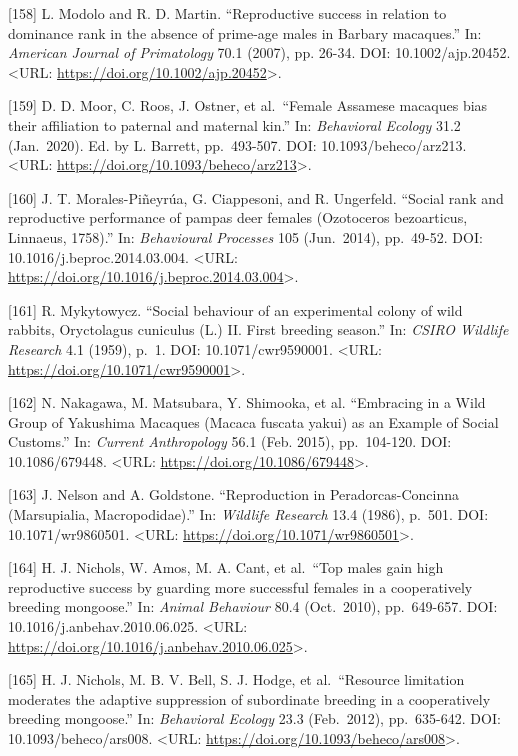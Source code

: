 \documentclass[
]{article}
\begin{document}
{[}158{]} L. Modolo and R. D. Martin. ``Reproductive success in relation
to dominance rank in the absence of prime-age males in Barbary
macaques.'' In: \emph{American Journal of Primatology} 70.1 (2007), pp.
26-34. DOI: 10.1002/ajp.20452. \textless URL:
\url{https://doi.org/10.1002/ajp.20452}\textgreater.

{[}159{]} D. D. Moor, C. Roos, J. Ostner, et al.~``Female Assamese
macaques bias their affiliation to paternal and maternal kin.'' In:
\emph{Behavioral Ecology} 31.2 (Jan.~2020). Ed. by L. Barrett,
pp.~493-507. DOI: 10.1093/beheco/arz213. \textless URL:
\url{https://doi.org/10.1093/beheco/arz213}\textgreater.

{[}160{]} J. T. Morales-Piñeyrúa, G. Ciappesoni, and R. Ungerfeld.
``Social rank and reproductive performance of pampas deer females
(Ozotoceros bezoarticus, Linnaeus, 1758).'' In: \emph{Behavioural
Processes} 105 (Jun.~2014), pp.~49-52. DOI:
10.1016/j.beproc.2014.03.004. \textless URL:
\url{https://doi.org/10.1016/j.beproc.2014.03.004}\textgreater.

{[}161{]} R. Mykytowycz. ``Social behaviour of an experimental colony of
wild rabbits, Oryctolagus cuniculus (L.) II. First breeding season.''
In: \emph{CSIRO Wildlife Research} 4.1 (1959), p.~1. DOI:
10.1071/cwr9590001. \textless URL:
\url{https://doi.org/10.1071/cwr9590001}\textgreater.

{[}162{]} N. Nakagawa, M. Matsubara, Y. Shimooka, et al. ``Embracing in
a Wild Group of Yakushima Macaques (Macaca fuscata yakui) as an Example
of Social Customs.'' In: \emph{Current Anthropology} 56.1 (Feb. 2015),
pp.~104-120. DOI: 10.1086/679448. \textless URL:
\url{https://doi.org/10.1086/679448}\textgreater.

{[}163{]} J. Nelson and A. Goldstone. ``Reproduction in
Peradorcas-Concinna (Marsupialia, Macropodidae).'' In: \emph{Wildlife
Research} 13.4 (1986), p.~501. DOI: 10.1071/wr9860501. \textless URL:
\url{https://doi.org/10.1071/wr9860501}\textgreater.

{[}164{]} H. J. Nichols, W. Amos, M. A. Cant, et al.~``Top males gain
high reproductive success by guarding more successful females in a
cooperatively breeding mongoose.'' In: \emph{Animal Behaviour} 80.4
(Oct.~2010), pp.~649-657. DOI: 10.1016/j.anbehav.2010.06.025.
\textless URL:
\url{https://doi.org/10.1016/j.anbehav.2010.06.025}\textgreater.

{[}165{]} H. J. Nichols, M. B. V. Bell, S. J. Hodge, et al.~``Resource
limitation moderates the adaptive suppression of subordinate breeding in
a cooperatively breeding mongoose.'' In: \emph{Behavioral Ecology} 23.3
(Feb.~2012), pp.~635-642. DOI: 10.1093/beheco/ars008. \textless URL:
\url{https://doi.org/10.1093/beheco/ars008}\textgreater.
\end{document}
